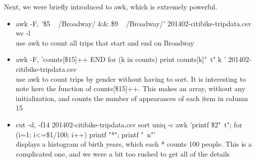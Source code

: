 Next, we were briefly introduced to awk, which is extremely powerful.
\begin{itemize}
    \item awk -F, '\$5 ~ /Broadway/ \&\& \$9 ~ /Broadway/' 201402-citibike-tripdata.csv \textbar wc -l \\
    use awk to count all trips that start and end on Broadway
    \item awk -F, '{counts[\$15]++} END {for (k in counts) print counts[k]"\ t" k }' 201402-citibike-tripdata.csv \\
    use awk to count trips by gender without having to sort. It is interesting to note here the function of {counts[\$15]++}. This makes an array, without any initialization, and counts the number of appearances of each item in column 15
    \item cut -d, -f14 201402-citibike-tripdata.csv \textbar sort \textbar uniq -c \textbar awk '{printf \$2"\ t"; for (i=1; i<=\$1/100; i++) printf "*"; printf "\ n"}' \\
    displays a histogram of birth years, which each * counts 100 people. This is a complicated one, and we were a bit too rushed to get all of the details
\end{itemize}

